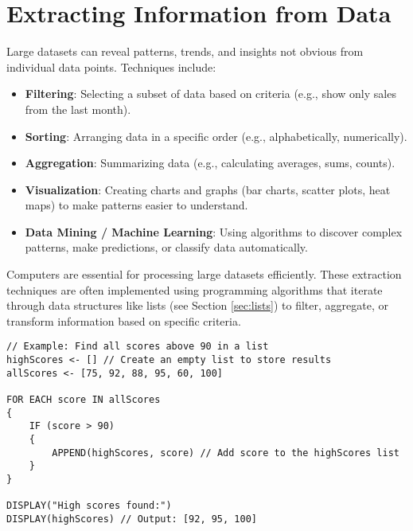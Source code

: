 \documentclass[11pt,oneside]{book}
\begin{document}
\section{Extracting Information from Data}
\label{sec:extracting_info}
Large datasets can reveal patterns, trends, and insights not obvious from individual data points. Techniques include:
\begin{itemize}
    \item \textbf{Filtering}: Selecting a subset of data based on criteria (e.g., show only sales from the last month).
    \item \textbf{Sorting}: Arranging data in a specific order (e.g., alphabetically, numerically).
    \item \textbf{Aggregation}: Summarizing data (e.g., calculating averages, sums, counts).
    \item \textbf{Visualization}: Creating charts and graphs (bar charts, scatter plots, heat maps) to make patterns easier to understand.
    \item \textbf{Data Mining / Machine Learning}: Using algorithms to discover complex patterns, make predictions, or classify data automatically.
\end{itemize}
Computers are essential for processing large datasets efficiently. These extraction techniques are often implemented using programming algorithms that iterate through data structures like lists (see Section \ref{sec:lists}) to filter, aggregate, or transform information based on specific criteria.

\begin{lstlisting}[language={}, label={lst:data_filtering_example}, caption={AP Pseudocode: Filtering Data in a List}]
// Example: Find all scores above 90 in a list
highScores <- [] // Create an empty list to store results
allScores <- [75, 92, 88, 95, 60, 100]

FOR EACH score IN allScores
{
    IF (score > 90)
    {
        APPEND(highScores, score) // Add score to the highScores list
    }
}

DISPLAY("High scores found:")
DISPLAY(highScores) // Output: [92, 95, 100]
\end{lstlisting}
\end{document}
